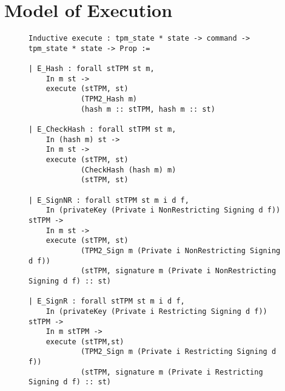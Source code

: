 \chapter{Model of Execution}


\begin{figure}[h]
\begin{lstlisting}[language=Coq]
Inductive execute : tpm_state * state -> command -> tpm_state * state -> Prop :=

| E_Hash : forall stTPM st m,
    In m st ->
    execute (stTPM, st)
            (TPM2_Hash m)
            (hash m :: stTPM, hash m :: st)

| E_CheckHash : forall stTPM st m,
    In (hash m) st ->
    In m st ->
    execute (stTPM, st)
            (CheckHash (hash m) m)
            (stTPM, st)

| E_SignNR : forall stTPM st m i d f,
    In (privateKey (Private i NonRestricting Signing d f)) stTPM ->
    In m st ->
    execute (stTPM, st)
            (TPM2_Sign m (Private i NonRestricting Signing d f))
            (stTPM, signature m (Private i NonRestricting Signing d f) :: st)

| E_SignR : forall stTPM st m i d f,
    In (privateKey (Private i Restricting Signing d f)) stTPM ->
    In m stTPM ->
    execute (stTPM,st)
            (TPM2_Sign m (Private i Restricting Signing d f))
            (stTPM, signature m (Private i Restricting Signing d f) :: st)
\end{lstlisting}
\end{figure}   
      
